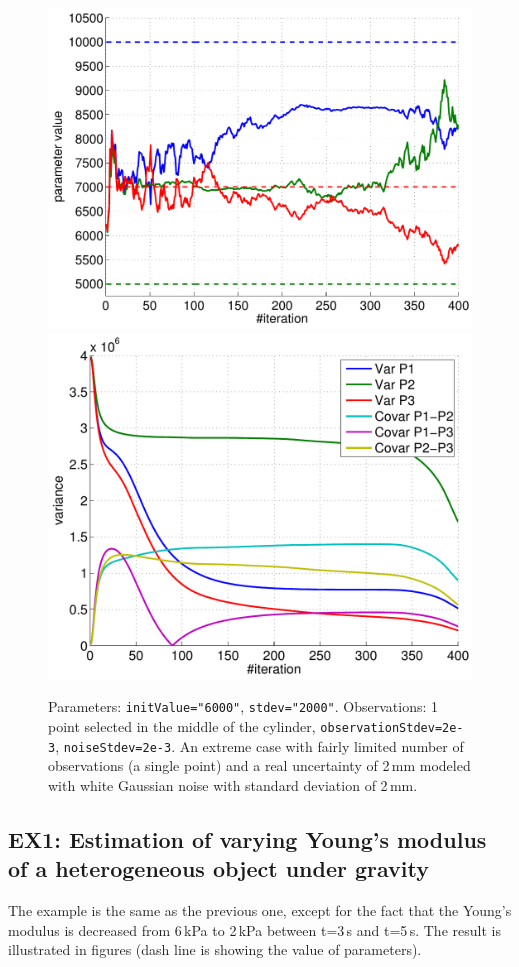 \documentclass[10pt]{article}
\begin{document}
\begin{figure}[h]
\begin{center}
\includegraphics[width=.49\linewidth]{figures/p6_estim.pdf}
\hfill
\includegraphics[width=.49\linewidth]{figures/p6_var.pdf}
\caption{Parameters: \texttt{initValue="6000"}, \texttt{stdev="2000"}. Observations: 1 point selected in the middle of the cylinder,
\texttt{observationStdev=2e-3}, \texttt{noiseStdev=2e-3}. An extreme case with fairly limited number of observations (a single point) and a real
uncertainty of 2\,mm modeled with white Gaussian noise with standard deviation of 2\,mm.}
\label{fig:Results1}
\end{center}
\end{figure}

\subsection{EX1: Estimation of varying Young's modulus of a heterogeneous object under gravity}
The example is the same as the previous one, except for the fact that the Young's modulus is decreased from 6\,kPa to 2\,kPa between t=3\,s and t=5\,s.
The result is illustrated in figures (dash line is showing the value of parameters).
\end{document}
